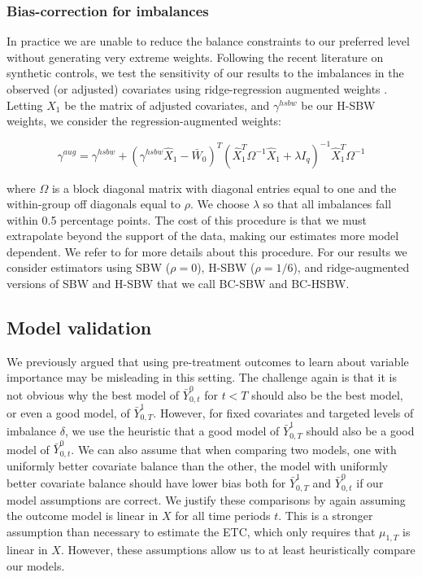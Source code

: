 \documentclass[aoas]{imsart}
\theoremstyle{plain}
\theoremstyle{remark}
\begin{document}
\subsubsection{Bias-correction for imbalances}

In practice we are unable to reduce the balance constraints to our preferred level without generating very extreme weights. Following the recent literature on synthetic controls, we test the sensitivity of our results to the imbalances in the observed (or adjusted) covariates using ridge-regression augmented weights \cite{ben2018augmented}. Letting $\hat{X}_1$ be the matrix of adjusted covariates, and $\gamma^{hsbw}$ be our H-SBW weights, we consider the regression-augmented weights:

\begin{equation}
\gamma^{aug} = \gamma^{hsbw} + (\gamma^{hsbw}\hat{X}_1 - \bar{W}_0)^T(\hat{X}_1^T\Omega^{-1}\hat{X}_1 + \lambda I_q)^{-1}\hat{X}_1^T\Omega^{-1}
\end{equation}

where $\Omega$ is a block diagonal matrix with diagonal entries equal to one and the within-group off diagonals equal to $\rho$. We choose $\lambda$ so that all imbalances fall within 0.5 percentage points. The cost of this procedure is that we must extrapolate beyond the support of the data, making our estimates more model dependent. We refer to \cite{ben2018augmented} for more details about this procedure. For our results we consider estimators using SBW ($\rho = 0$), H-SBW ($\rho = 1/6$), and ridge-augmented versions of SBW and H-SBW that we call BC-SBW and BC-HSBW. 

\subsection{Model validation}

We previously argued that using pre-treatment outcomes to learn about variable importance may be misleading in this setting. The challenge again is that it is not obvious why the best model of $\bar{Y}_{0, t}^0$ for $t < T$ should also be the best model, or even a good model, of $\bar{Y}^1_{0,T}$. However, for fixed covariates and targeted levels of imbalance $\delta$, we use the heuristic that a good model of $\bar{Y}^1_{0,T}$ should also be a good model of $\bar{Y}_{0, t}^0$. We can also assume that when comparing two models, one with uniformly better covariate balance than the other, the model with uniformly better covariate balance should have lower bias both for $\bar{Y}_{0, T}^1$ and $\bar{Y}_{0, t}^0$ if our model assumptions are correct. We justify these comparisons by again assuming the outcome model is linear in $X$ for all time periods $t$. This is a stronger assumption than necessary to estimate the ETC, which only requires that $\mu_{1, T}$ is linear in $X$. However, these assumptions allow us to at least heuristically compare our models. 
\end{document}
